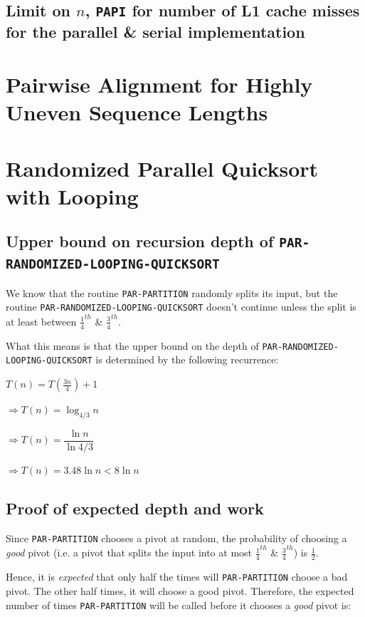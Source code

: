 \documentclass{article}
\begin{document}
\subsection{Limit on $n$, \texttt{PAPI} for number of L1 cache misses for the parallel \& serial implementation}



\clearpage

\section{Pairwise Alignment for Highly Uneven Sequence Lengths}

\clearpage

\section{Randomized Parallel Quicksort with Looping}

\subsection{Upper bound on recursion depth of \texttt{PAR-RANDOMIZED-LOOPING-QUICKSORT}}

We know that the routine \texttt{PAR-PARTITION} randomly splits its
input, but the routine \texttt{PAR-RANDOMIZED-LOOPING-QUICKSORT}
doesn't continue unless the split is at least between
$\frac{1}{4}^{th}$ \& $\frac{3}{4}^{th}$.

What this means is that the upper bound on the depth of
\texttt{PAR-RANDOMIZED-LOOPING-QUICKSORT} is determined by the
following recurrence:

$T(n) = T(\frac{3n}{4}) + 1$

$\Rightarrow T(n) = \log_{4/3}{n}$

$\Rightarrow T(n) = \dfrac{\ln{n}}{\ln{4/3}}$

$\Rightarrow T(n) = 3.48\ln{n} < 8\ln{n}$

\subsection{Proof of expected depth and work}

Since \texttt{PAR-PARTITION} chooses a pivot at random, the
probability of choosing a \textit{good} pivot (i.e. a pivot that
splits the input into at most $\frac{1}{4}^{th}$ \&
$\frac{3}{4}^{th}$) is $\frac{1}{2}$.

Hence, it is \textit{expected} that only half the times will
\texttt{PAR-PARTITION} choose a bad pivot. The other half times, it
will choose a good pivot. Therefore, the expected number of times
\texttt{PAR-PARTITION} will be called before it chooses a
\textit{good} pivot is:
\end{document}
